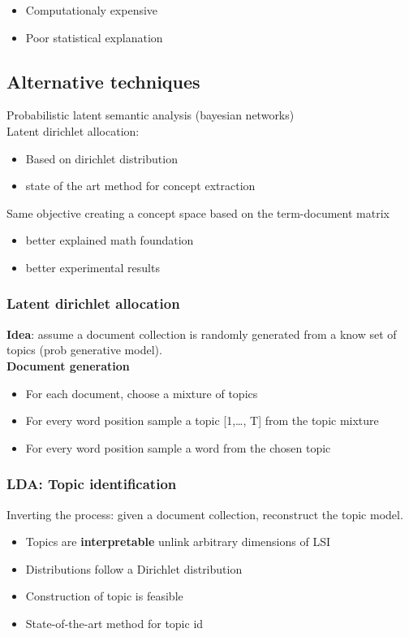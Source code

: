 \begin{itemize}
\item Computationaly expensive
\item Poor statistical explanation
\end{itemize}

\subsection{Alternative techniques}

Probabilistic latent semantic analysis (bayesian networks) \\

Latent dirichlet allocation:
\begin{itemize}
\item Based on dirichlet distribution
\item state of the art method for concept extraction
\end{itemize}

Same objective creating a concept space based on the term-document
matrix
\begin{itemize}
\item better explained math foundation
\item better experimental results
\end{itemize}

\subsubsection{Latent dirichlet allocation}

\textbf{Idea}: assume a document collection is randomly generated from
a know set of topics (prob generative model). \\

\textbf{Document generation} \\
\begin{itemize}
\item For each document, choose a mixture of topics
\item For every word position sample a topic [1,\ldots, T] from the
  topic mixture
\item For every word position sample a word from the chosen topic
\end{itemize}

\subsubsection{LDA: Topic identification}
Inverting the process: given a document collection, reconstruct the
topic model.
\begin{itemize}
\item Topics are \textbf{interpretable} unlink arbitrary dimensions of
  LSI
\item Distributions follow a Dirichlet distribution
\item Construction of topic is feasible
\item State-of-the-art method for topic id
\end{itemize}

